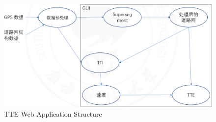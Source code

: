 \documentclass[fontset=none]{ctexart}
\theoremstyle{definition}
\theoremstyle{remark}
\begin{document}
\begin{figure}[htb]
  \centering
  \includegraphics[width=\textwidth]{images/TTE_app_overview.png}
  \caption{TTE Web Application Structure}
  \label{web-application-structure}
\end{figure}

% 
% 
\end{document}
